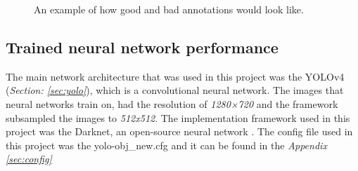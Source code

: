 \begin{figure}[h]
 \centering
 \hfill
 \caption{An example of how good and bad annotations would look like.}
 \label{figure: goodandbad}
\end{figure}
\clearpage

\subsection{Trained neural network performance}
The main network architecture that was used in this project was the YOLOv4 (\textit{Section: \ref{sec:yolo}}), which is a convolutional neural network.
The images that neural networks train on, had the resolution of \textit{1280×720} and the framework subsampled the images to \textit{512x512}. The implementation framework used in this project was the Darknet, an open-source neural network \cite{alexey_alexeyabdarknet_2021}. The config file used in this project was the yolo-obj\_new.cfg and it can be found in the \textit{Appendix \ref{sec:config}}



